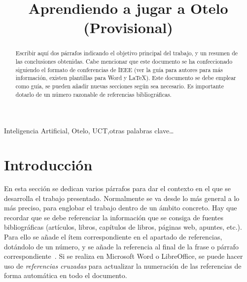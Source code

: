 \documentclass[conference,a4paper]{IEEEtran}
\begin{document}
\title{Aprendiendo a jugar a Otelo (Provisional)}

\author{
  
  \and
  
}

\maketitle


\begin{abstract}
  Escribir aquí dos párrafos indicando el objetivo principal del trabajo, y un
  resumen de las conclusiones obtenidas. Cabe mencionar que este documento se
  ha confeccionado siguiendo el formato de conferencias de IEEE (ver la guía
  para autores para más información, existen plantillas para Word y \LaTeX).
  Este documento se debe emplear como guía, se pueden añadir nuevas secciones
  según sea necesario. Es importante dotarlo de un número razonable de
  referencias bibliográficas.
\end{abstract}


\begin{IEEEkeywords}
  Inteligencia Artificial, Otelo, UCT,otras palabras clave…
\end{IEEEkeywords}


\section{Introducción}

En esta sección se dedican varios párrafos para dar el contexto en el que se
desarrolla el trabajo presentado. Normalmente se va desde lo más general a lo
más preciso, para englobar el trabajo dentro de un ámbito concreto. Hay que
recordar que se debe referenciar la información que se consiga de fuentes
bibliográficas (artículos, libros, capítulos de libros, páginas web, apuntes,
etc.). Para ello se añade el ítem correspondiente en el apartado de
referencias, dotándolo de un número, y se añade la referencia al final de la
frase o párrafo correspondiente~\cite{b1}. Si se realiza en Microsoft Word o
LibreOffice, se puede hacer uso de \emph{referencias cruzadas} para actualizar
la numeración de las referencias de forma automática en todo el documento.
\end{document}
